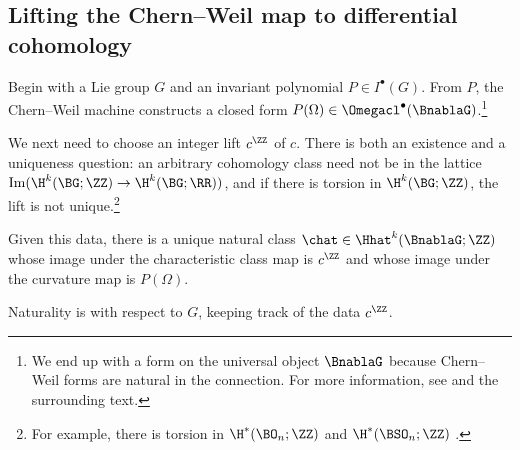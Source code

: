 
\subsection{Lifting the Chern--Weil map to differential cohomology}

Begin with a Lie group $G$ and an invariant polynomial $P\in I^\bullet(G)$. From $P$, the Chern--Weil machine
constructs a closed form $P(\Omega)\in \Omegacl^\bullet(\BnablaG)$.\footnote{We end up with a form on the
universal object $\BnablaG$ because Chern--Weil forms are natural in the connection. For more information,
see \cite[(7.21)]{FreedHopkins} and the surrounding text.}

We next need to choose an integer lift $c^\ZZ$ of $c$. There is both an existence and a uniqueness question: an
arbitrary cohomology class need not be in the lattice $\operatorname{Im}(\H^k(\BG;\ZZ)\to \H^k(\BG;\RR))$, and if
there is torsion in $\H^k(\BG;\ZZ)$, the lift is not unique.\footnote{For example, there is torsion in
$\H^*(\BO_n; \ZZ)$ and $\H^*(\BSO_n;\ZZ)$ \cite{Bro82}.}

\begin{thm}
\label{differential_CW_lift}
Given this data, there is a unique natural class $\chat\in\Hhat^k(\BnablaG; \ZZ)$ whose image under the
characteristic class map is $c^\ZZ$ and whose image under the curvature map is $P(\Omega)$.
\end{thm}

\noindent Naturality is with respect to $G$, keeping track of the data $c^\ZZ$.

